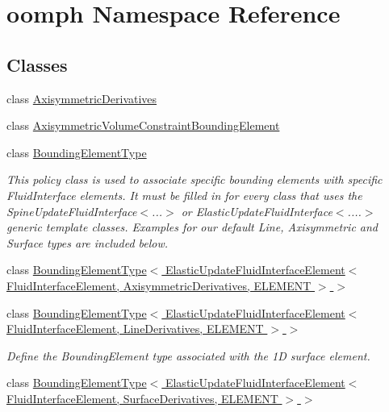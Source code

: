 \hypertarget{namespaceoomph}{}\section{oomph Namespace Reference}
\label{namespaceoomph}
\subsection*{Classes}
\begin{DoxyCompactItemize}
\item 
class \hyperlink{classoomph_1_1AxisymmetricDerivatives}{Axisymmetric\+Derivatives}
\item 
class \hyperlink{classoomph_1_1AxisymmetricVolumeConstraintBoundingElement}{Axisymmetric\+Volume\+Constraint\+Bounding\+Element}
\item 
class \hyperlink{classoomph_1_1BoundingElementType}{Bounding\+Element\+Type}
\begin{DoxyCompactList}\small\item\em This policy class is used to associate specific bounding elements with specific Fluid\+Interface elements. It must be filled in for every class that uses the Spine\+Update\+Fluid\+Interface$<$...$>$ or Elastic\+Update\+Fluid\+Interface$<$....$>$ generic template classes. Examples for our default Line, Axisymmetric and Surface types are included below. \end{DoxyCompactList}\item 
class \hyperlink{classoomph_1_1BoundingElementType_3_01ElasticUpdateFluidInterfaceElement_3_01FluidInterfaceEleme3184fbb3565ba21902c1c3c09e7b1c72}{Bounding\+Element\+Type$<$ Elastic\+Update\+Fluid\+Interface\+Element$<$ Fluid\+Interface\+Element, Axisymmetric\+Derivatives, E\+L\+E\+M\+E\+N\+T $>$ $>$}
\item 
class \hyperlink{classoomph_1_1BoundingElementType_3_01ElasticUpdateFluidInterfaceElement_3_01FluidInterfaceEleme25258208c656cd18bb5e78a946d0c1ca}{Bounding\+Element\+Type$<$ Elastic\+Update\+Fluid\+Interface\+Element$<$ Fluid\+Interface\+Element, Line\+Derivatives, E\+L\+E\+M\+E\+N\+T $>$ $>$}
\begin{DoxyCompactList}\small\item\em Define the Bounding\+Element type associated with the 1D surface element. \end{DoxyCompactList}\item 
class \hyperlink{classoomph_1_1BoundingElementType_3_01ElasticUpdateFluidInterfaceElement_3_01FluidInterfaceEleme0e022f57b173f7bea5703185db24e722}{Bounding\+Element\+Type$<$ Elastic\+Update\+Fluid\+Interface\+Element$<$ Fluid\+Interface\+Element, Surface\+Derivatives, E\+L\+E\+M\+E\+N\+T $>$ $>$}

\end{DoxyCompactItemize}
